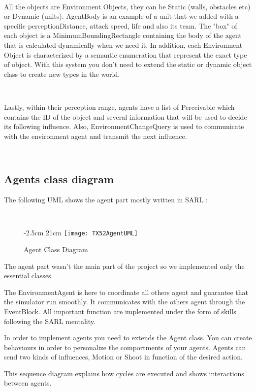 \documentclass[a4paper,10pt]{book}
\begin{document}
~

All the objects are Environment Objects, they can be Static (walls, obstacles etc) or Dynamic (units). AgentBody is an example of a unit that we added with a specific perceptionDistance, attack speed, life and also its team. The "box" of each object is a MinimumBoundingRectangle containing the body of the agent that is calculated dynamically when we need it.
In addition, each Environment Object is characterized by a semantic enumeration that represent the exact type of object. With this system you don't need to extend the static or dynamic object class to create new types in the world.

~

Lastly, within their perception range, agents have a list of Perceivable which contains the ID of the object and several information that will be used to decide its following influence. Also, EnvironmentChangeQuery is used to communicate with the environment agent and transmit the next influence.

~

\newpage
\subsection{Agents class diagram}

The following UML shows the agent part mostly written in SARL :

~

\begin{figure}[!ht]
  -2.5cm 21cm
 \centering
 \texttt{[image: TX52AgentUML]}
 \caption{Agent Class Diagram}
\end{figure}

The agent part wasn't the main part of the project so we implemented only the essential classes.

The EnvironmentAgent is here to coordinate all others agent and guarantee that the simulator run smoothly. It communicates with the others agent through the EventBlock.
All important function are implemented under the form of skills following the SARL mentality. 

In order to implement agents you need to extends the Agent class. You can create behaviours in order to personalize the comportments of your agents. Agents can send two kinds of influences, Motion or Shoot in function of the desired action.

This sequence diagram explains how cycles are executed and shows interactions between agents.
\end{document}
